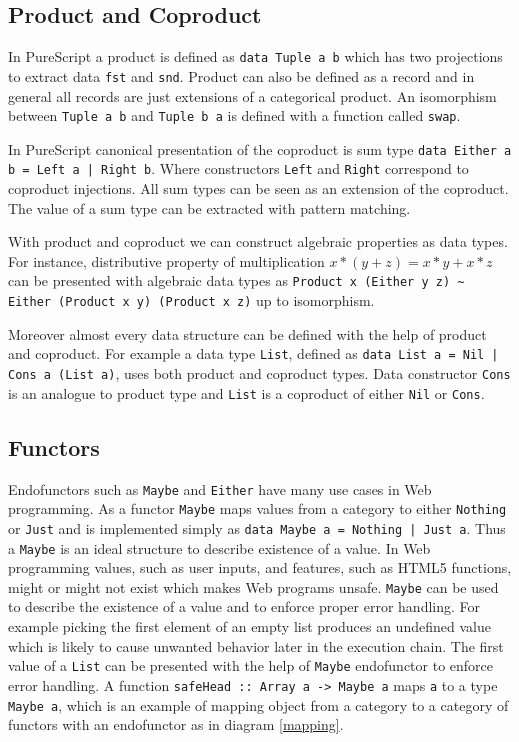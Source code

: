 \documentclass[article]{aaltoseries}
\begin{document}
  \subsection{Product and Coproduct}
    In PureScript a product is defined as \lstinline|data Tuple a b| which has
    two projections to extract data \lstinline|fst| and \lstinline|snd|. Product
    can also be defined as a record and in general all records are just
    extensions of a categorical product. An isomorphism between
    \lstinline|Tuple a b| and \lstinline|Tuple b a| is defined with a function
    called \lstinline|swap|.
    
    In PureScript canonical presentation of the coproduct is sum type
    \lstinline{data Either a b = Left a | Right b}. Where constructors
    \lstinline|Left| and \lstinline|Right| correspond to coproduct injections.
    All sum types can be seen as an extension of the coproduct. The value of a
    sum type can be extracted with pattern matching.
    
    With product and coproduct we can construct algebraic properties as data
    types. For instance, distributive property of multiplication $x * (y + z) =
    x * y + x * z$ can be presented with algebraic data types as
    \lstinline|Product x (Either y z) ~ Either (Product x y) (Product x z)| up
    to isomorphism.

    Moreover almost every data structure can be defined with the help of
    product and coproduct. For example a data type \lstinline|List|, defined as
    \lstinline{data List a = Nil | Cons a (List a)}, uses both product and
    coproduct types. Data constructor \lstinline|Cons| is an analogue to product
    type and \lstinline|List| is a coproduct of either \lstinline|Nil| or \lstinline|Cons|.

    

  \subsection{Functors}
    Endofunctors such as \lstinline|Maybe| and \lstinline|Either| have many use
    cases in Web programming. As a functor \lstinline|Maybe| maps values from a
    category to either \lstinline|Nothing| or \lstinline|Just| and is
    implemented simply as \lstinline{data Maybe a = Nothing | Just a}. Thus a
    \lstinline|Maybe| is an ideal structure to describe existence of a value. In
    Web programming values, such as user inputs, and features, such as HTML5
    functions, might or might not exist which makes Web programs unsafe.
    \lstinline|Maybe| can be used to describe the existence of a value and to enforce
    proper error handling. For example picking the first element of an empty
    list produces an undefined value which is likely to cause unwanted behavior
    later in the execution chain. The first value of a \lstinline|List| can be
    presented with the help of \lstinline|Maybe| endofunctor to enforce error
    handling. A function \lstinline|safeHead :: Array a -> Maybe a| maps
    \lstinline|a| to a type \lstinline|Maybe a|, which is an example of mapping
    object from a category to a category of functors with an endofunctor as in
    diagram \ref{mapping}.
\end{document}
